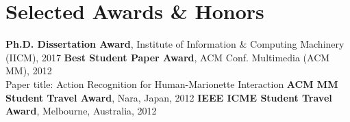 \section{Selected Awards \& Honors}
\PubItemStart
    \pubitem \textbf{Ph.D. Dissertation Award}, Institute of Information \& Computing Machinery (IICM), 2017
    \pubitem \textbf{Best Student Paper Award}, ACM Conf. Multimedia (ACM MM), 2012\\
    Paper title: Action Recognition for Human-Marionette Interaction
    \pubitem \textbf{ACM MM Student Travel Award}, Nara, Japan, 2012
    \pubitem \textbf{IEEE ICME Student Travel Award}, Melbourne, Australia, 2012
\PubItemEnd